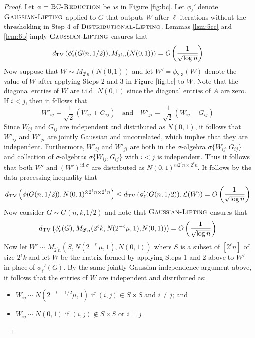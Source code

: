 \begin{proof}
Let $\phi = \textsc{BC-Reduction}$ be as in Figure \ref{fig:bc}. Let $\phi_\ell'$ denote $\textsc{Gaussian-Lifting}$ applied to $G$ that outputs $W$ after $\ell$ iterations without the thresholding in Step 4 of $\textsc{Distributional-Lifting}$. Lemmas \ref{lem:5cc} and \ref{lem:6b} imply $\textsc{Gaussian-Lifting}$ ensures that
$$d_{\text{TV}}\left( \phi_\ell'(G(n, 1/2)), M_{2^{\ell} n}(N(0, 1)) \right) = O\left( \frac{1}{\sqrt{\log n}} \right)$$
Now suppose that $W \sim M_{2^{\ell} n}(N(0, 1))$ and let $W' = \phi_{\text{2-3}}(W)$ denote the value of $W$ after applying Steps 2 and 3 in Figure \ref{fig:bc} to $W$. Note that the diagonal entries of $W$ are i.i.d. $N(0, 1)$ since the diagonal entries of $A$ are zero. If $i < j$, then it follows that
$$W'_{ij} = \frac{1}{\sqrt{2}} \left( W_{ij} + G_{ij} \right) \quad \text{and} \quad W'_{ji} = \frac{1}{\sqrt{2}} \left( W_{ij} - G_{ij} \right)$$
Since $W_{ij}$ and $G_{ij}$ are independent and distributed as $N(0, 1)$, it follows that $W'_{ij}$ and $W'_{ji}$ are jointly Gaussian and uncorrelated, which implies that they are independent. Furthermore, $W'_{ij}$ and $W'_{ji}$ are both in the $\sigma$-algebra $\sigma\{W_{ij}, G_{ij}\}$ and collection of $\sigma$-algebras $\sigma\{W_{ij}, G_{ij}\}$ with $i < j$ is independent. Thus it follows that both $W'$ and $(W')^{\text{id}, \sigma}$ are distributed as $N(0, 1)^{\otimes 2^\ell n \times 2^\ell n}$. It follows by the data processing inequality that
$$d_{\text{TV}}\left( \phi(G(n, 1/2)), N(0, 1)^{\otimes 2^\ell n \times 2^\ell n} \right) \le d_{\text{TV}}\left( \phi'_{\ell}(G(n, 1/2)), \mathcal{L}(W) \right) = O\left( \frac{1}{\sqrt{\log n}} \right)$$
Now consider $G \sim G(n, k, 1/2)$ and note that $\textsc{Gaussian-Lifting}$ ensures that
$$d_{\text{TV}}\left( \phi_\ell'(G), M_{2^{\ell} n}(2^{\ell} k, N(2^{-\ell}\mu, 1), N(0, 1)) \right) = O\left( \frac{1}{\sqrt{\log n}} \right)$$
Now let $W' \sim M_{2^{\ell} n}(S, N(2^{-\ell}\mu, 1), N(0, 1))$ where $S$ is a subset of $[2^\ell n]$ of size $2^\ell k$ and let $W$ be the matrix formed by applying Steps 1 and 2 above to $W'$ in place of $\phi_\ell'(G)$. By the same jointly Gaussian independence argument above, it follows that the entries of $W$ are independent and distributed as:
\begin{itemize}
\item $W_{ij} \sim N(2^{-\ell-1/2} \mu, 1)$ if $(i, j) \in S \times S$ and $i \neq j$; and
\item $W_{ij} \sim N(0, 1)$ if $(i, j) \not \in S \times S$ or $i = j$.
\end{itemize}

\end{proof}

